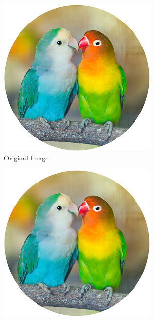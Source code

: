 \documentclass{article}
\begin{document}
    \begin{figure}
        \centering
            \begin{subfigure}{0.3\textwidth}
                \includegraphics[width=\textwidth]{parrot.jpeg}
                \caption{Original Image}
            \end{subfigure}
            \hfill
            \begin{subfigure}{0.3\textwidth}
                \includegraphics[angle=90, width=\textwidth]{parrot.jpeg}

\end{subfigure}
\end{figure}
\end{document}
